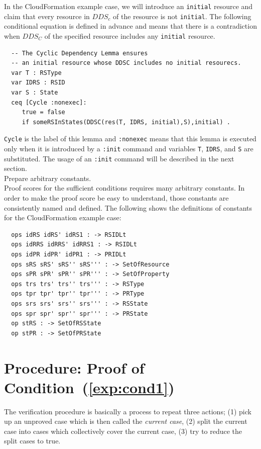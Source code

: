 \documentclass[12pt]{report}
\begin{document}
In the CloudFormation example case, we will introduce an {\tt initial}
resource and claim that every resource in $DDS\!_c$ of the resource is
not {\tt initial}. The following conditional equation is defined in
advance and means that there is a contradiction when $DDS\!_C$ of the
specified resource includes any {\tt initial} resource.
\small
\begin{verbatim}
  -- The Cyclic Dependency Lemma ensures
  -- an initial resource whose DDSC includes no initial resourecs.
  var T : RSType
  var IDRS : RSID
  var S : State
  ceq [Cycle :nonexec]: 
     true = false
     if someRSInStates(DDSC(res(T, IDRS, initial),S),initial) .
\end{verbatim}
\normalsize
{\tt Cycle} is the label of this lemma and {\tt :nonexec} means that
this lemma is executed only when it is introduced by a {\tt :init}
command and variables {\tt T}, {\tt IDRS}, and {\tt S} are
substituted. The usage of an {\tt :init} command will be described in
the next section.\\

 Prepare arbitrary constants. \\
Proof scores for the sufficient conditions requires many arbitrary constants.
In order to make the proof score be easy to understand, those constants
are consistently named and defined. The following shows the definitions
of constants for the CloudFormation example case:
\small
\begin{verbatim}
  ops idRS idRS' idRS1 : -> RSIDLt
  ops idRRS idRRS' idRRS1 : -> RSIDLt
  ops idPR idPR' idPR1 : -> PRIDLt
  ops sRS sRS' sRS'' sRS''' : -> SetOfResource
  ops sPR sPR' sPR'' sPR''' : -> SetOfProperty
  ops trs trs' trs'' trs''' : -> RSType
  ops tpr tpr' tpr'' tpr''' : -> PRType
  ops srs srs' srs'' srs''' : -> RSState
  ops spr spr' spr'' spr''' : -> PRState
  op stRS : -> SetOfRSState
  op stPR : -> SetOfPRState
\end{verbatim}
\normalsize
\section{Procedure: Proof of Condition~(\ref{exp:cond1})}
\label{sec:initcont}
The verification procedure is basically a process to repeat three
actions; (1) pick up an unproved case which is then called the
{\it current case}, (2) split the current case into cases which
collectively cover the current case, (3) try to reduce the split cases
to true.\\
\end{document}
